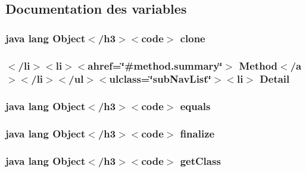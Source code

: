 \subsection{Documentation des variables}
\hypertarget{_graph_view_data_8html_adc9607fcabf6f2d7f401ad52015ef6e0}{
\subsubsection[{clone}]{\setlength{\rightskip}{0pt plus 5cm}java lang Object$<$/h3$>$$<$code$>$ clone}}\label{_graph_view_data_8html_adc9607fcabf6f2d7f401ad52015ef6e0}
\hypertarget{_graph_view_data_8html_a1e04b5ec07bcd5281e26dcd40e5b3a94}{
\subsubsection[{Detail}]{\setlength{\rightskip}{0pt plus 5cm}$<$/li$>$$<$li$>$$<$ahref=\char`\"{}\#method.\-summary\char`\"{}$>$ Method$<$/{\bf a}$>$$<$/li$>$$<$/ul$>$$<$ulclass=\char`\"{}sub\-Nav\-List\char`\"{}$>$$<$li$>$ Detail}}\label{_graph_view_data_8html_a1e04b5ec07bcd5281e26dcd40e5b3a94}
\hypertarget{_graph_view_data_8html_a8974318cea585f72df717e0380ec7104}{
\subsubsection[{equals}]{\setlength{\rightskip}{0pt plus 5cm}java lang Object$<$/h3$>$$<$code$>$ equals}}\label{_graph_view_data_8html_a8974318cea585f72df717e0380ec7104}
\hypertarget{_graph_view_data_8html_ab2315181ead4aeedef2374039b6ddde7}{
\subsubsection[{finalize}]{\setlength{\rightskip}{0pt plus 5cm}java lang Object$<$/h3$>$$<$code$>$ finalize}}\label{_graph_view_data_8html_ab2315181ead4aeedef2374039b6ddde7}
\hypertarget{_graph_view_data_8html_a98e6644727fe65eac217a6855045be43}{
\subsubsection[{get\-Class}]{\setlength{\rightskip}{0pt plus 5cm}java lang Object$<$/h3$>$$<$code$>$ get\-Class}}\label{_graph_view_data_8html_a98e6644727fe65eac217a6855045be43}
